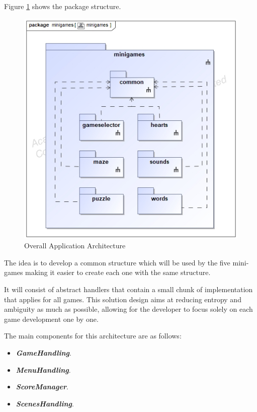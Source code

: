 
\newpage
Figure \ref{fig:packages} shows the package structure.

\begin{figure}[H]
    \centering
    \includegraphics[scale=.5]{Chapters/arq/class__minigames__minigames.jpg}
    \caption{Overall Application Architecture}
    \label{fig:packages}
\end{figure}

The idea is to develop a common structure which will be used by the five mini-games making it easier to create each one with the same structure. 

It will consist of abstract handlers that contain a small chunk of implementation that applies for all games. This solution design aims at reducing entropy and ambiguity as much as possible, allowing for the developer to focus solely on each game development one by one.

The main components for this architecture are as follows:
\begin{itemize}
    \item \textbf{\textit{GameHandling}}.
    \item  \textbf{\textit{MenuHandling}}.
    \item \textbf{\textit{ScoreManager}}.
    \item \textbf{\textit{ScenesHandling}}.
\end{itemize}

